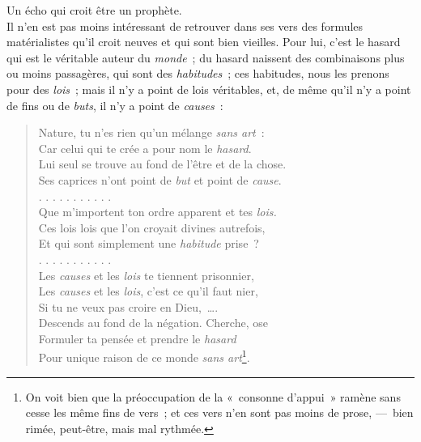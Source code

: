 \documentclass[french,twoside]{book} %
\begin{document}
Un écho qui croit être un prophète.\\

\noindent Il n’en est pas moins intéressant de retrouver dans ses vers des formules matérialistes qu’il croit neuves et qui sont bien vieilles. Pour lui, c’est le hasard qui est le véritable auteur du \emph{monde} ; du hasard naissent des combinaisons plus ou moins passagères, qui sont des \emph{habitudes} ; ces habitudes, nous les prenons pour des \emph{lois} ; mais il n’y a point de lois véritables, et, de même qu’il n’y a point de fins ou de \emph{buts}, il n’y a point de \emph{causes} :\par


\begin{verse}
Nature, tu n’es rien qu’un mélange \emph{sans art} :\\
Car celui qui te crée a pour nom le \emph{hasard}.\\
Lui seul se trouve au fond de l’être et de la chose.\\
Ses caprices n’ont point de \emph{but} et point de \emph{cause}.\\
. . . . . . . . . . .\\
Que m’importent ton ordre apparent et tes \emph{lois.}\\
Ces lois lois que l’on croyait divines autrefois,\\
Et qui sont simplement une \emph{habitude} prise ?\\
. . . . . . . . . . .\\
Les \emph{causes} et les \emph{lois} te tiennent prisonnier,\\
Les \emph{causes} et les \emph{lois}, c’est ce qu’il faut nier,\\
Si tu ne veux pas croire en Dieu, ….\\
Descends au fond de la négation. Cherche, ose\\
Formuler ta pensée et prendre le \emph{hasard}\\
Pour unique raison de ce monde \emph{sans art}\footnote{On voit bien que la préoccupation de la « consonne d’appui » ramène sans cesse les même fins de vers ; et ces vers n’en sont pas moins de prose, — bien rimée, peut-être, mais mal rythmée.}.\\
\end{verse}
\end{document}
